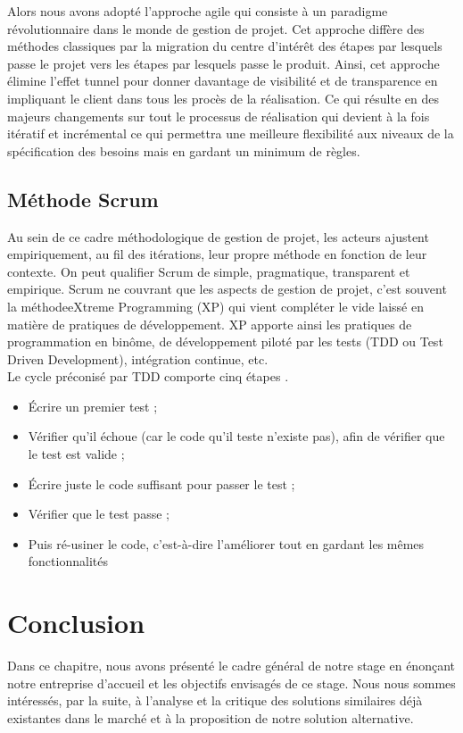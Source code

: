 Alors nous avons adopté l'approche agile qui consiste à un paradigme révolutionnaire dans le monde de gestion de projet. Cet approche diffère des méthodes classiques par la migration du centre d'intérêt des étapes par lesquels passe le projet vers les étapes par lesquels passe le produit. Ainsi, cet approche élimine l'effet tunnel pour donner davantage de visibilité et de transparence en impliquant le client dans  tous les procès de la réalisation. Ce qui résulte en des majeurs changements sur tout le processus de réalisation qui devient à la fois itératif et incrémental ce qui permettra une meilleure flexibilité aux niveaux de la spécification des besoins mais en gardant un minimum de règles.\\

\subsection{Méthode Scrum}

Au sein de ce cadre méthodologique de gestion de projet, les acteurs ajustent empiriquement, au fil des itérations, leur propre méthode en fonction de leur contexte. On peut qualifier Scrum de simple, pragmatique, transparent et empirique. Scrum ne couvrant que les aspects de gestion de projet, c’est souvent la méthodeeXtreme Programming (XP) qui vient compléter le vide laissé en matière de pratiques de développement. XP apporte ainsi les pratiques de programmation en binôme, de développement piloté par les tests (TDD ou Test Driven Development), intégration continue, etc.\\
Le cycle préconisé par TDD comporte cinq étapes \cite{2}.
   \begin{itemize}
   	\item Écrire un premier test ;
   	\item Vérifier qu’il échoue (car le code qu’il teste n’existe pas), afin de vérifier que le test est valide ;
   	\item Écrire juste le code suffisant pour passer le test ;
   	\item Vérifier que le test passe ;
   	\item Puis ré-usiner le code, c’est-à-dire l’améliorer tout en gardant les mêmes fonctionnalités
   \end{itemize}

\section*{Conclusion}

\qquad Dans ce chapitre, nous avons présenté le cadre général de notre stage en énonçant notre entreprise d’accueil et les objectifs envisagés de ce stage. Nous nous sommes intéressés, par la suite, à l’analyse et la critique des solutions similaires déjà existantes dans le marché et à la proposition de notre solution alternative.
